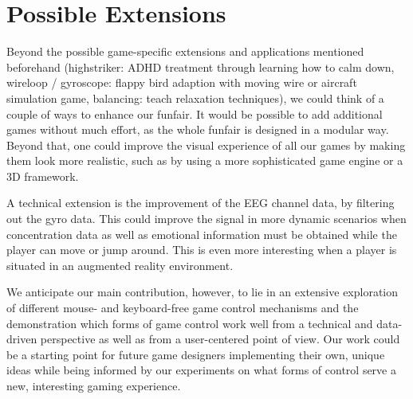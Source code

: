 \documentclass{utue} %
\begin{document}
\section{Possible Extensions}

Beyond the possible game-specific extensions and applications mentioned beforehand (highstriker: ADHD treatment through learning how to calm down, wireloop / gyroscope: flappy bird adaption with moving wire or aircraft simulation game, balancing: teach relaxation techniques), we could think of a couple of ways to enhance our funfair. It would be possible to add additional games without much effort, as the whole funfair is designed in a modular way. Beyond that, one could improve the visual experience of all our games by making them look more realistic, such as by using a more sophisticated game engine or a 3D framework.

A technical extension is the improvement of the EEG channel data, by filtering out the gyro data. This could improve the signal in more dynamic scenarios when concentration data as well as emotional information must be obtained while the player can move or jump around. This is even more interesting when a player is situated in an augmented reality environment.

We anticipate our main contribution, however, to lie in an extensive exploration of different mouse- and keyboard-free game control mechanisms and the demonstration which forms of game control work well from a technical and data-driven perspective as well as from a user-centered point of view. Our work could be a starting point for future game designers implementing their own, unique ideas while being informed by our experiments on what forms of control serve a new, interesting gaming experience.



\end{document}
